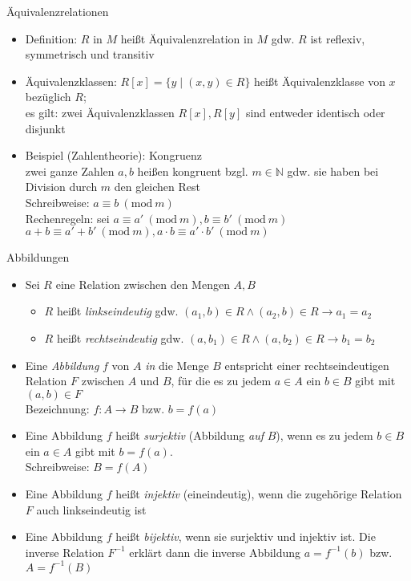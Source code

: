 \begin{frame}{Äquivalenzrelationen}
	\begin{itemize}
		\item Definition: $R$ in $M$ heißt Äquivalenzrelation in $M$ gdw. $R$ ist reflexiv, symmetrisch und transitiv
		\item Äquivalenzklassen: $R[x]=\{y \mid (x,y) \in R\}$ heißt Äquivalenzklasse von $x$ bezüglich $R$;\\
			es gilt: zwei Äquivalenzklassen $R[x], R[y]$ sind entweder identisch oder disjunkt
		\item Beispiel (Zahlentheorie): Kongruenz\\
			zwei ganze Zahlen $a,b$ heißen kongruent bzgl. $m \in \mathbb{N}$ gdw. sie haben bei Division durch $m$ den gleichen Rest\\
			Schreibweise: $a \equiv b\ (\mathrm{mod}\ m)$\\
			Rechenregeln: sei $a \equiv a'\ (\mathrm{mod}\ m), b \equiv b'\ (\mathrm{mod}\ m)$\\
			$a+b\equiv a'+b'\ (\mathrm{mod}\ m), a \cdot b \equiv a' \cdot b'\ (\mathrm{mod}\ m)$
	\end{itemize}
\end{frame}

\begin{frame}{Abbildungen}
	\begin{itemize}
		\item Sei $R$ eine Relation zwischen den Mengen $A,B$
		\begin{itemize}
			\item $R$ heißt \emph{linkseindeutig} gdw. $(a_1,b)\in R\land (a_2,b)\in R \rightarrow a_1=a_2$
			\item $R$ heißt \emph{rechtseindeutig} gdw. $(a,b_1)\in R\land (a,b_2)\in R \rightarrow b_1=b_2$
		\end{itemize}
		\item Eine \emph{Abbildung} $f$ von $A$ \emph{in} die Menge $B$ entspricht einer rechtseindeutigen Relation $F$ zwischen $A$ und $B$, für die es zu jedem $a\in A$ ein $b\in B$ gibt mit $(a,b) \in F$\\
		Bezeichnung: $f: A \rightarrow B$ bzw. $b=f(a)$
		\item Eine Abbildung $f$ heißt \emph{surjektiv} (Abbildung \emph{auf} $B$), wenn es zu jedem $b\in B$ ein $a\in A$ gibt mit $b=f(a)$.\\
		Schreibweise: $B = f(A)$
		\item Eine Abbildung $f$ heißt \emph{injektiv} (eineindeutig), wenn die zugehörige Relation $F$ auch linkseindeutig ist
		\item Eine Abbildung $f$ heißt \emph{bijektiv}, wenn sie surjektiv und injektiv ist. Die inverse Relation $F^{-1}$ erklärt dann die inverse Abbildung $a = f^{-1}(b)$ bzw. $A=f^{-1}(B)$
	\end{itemize}
\end{frame}

